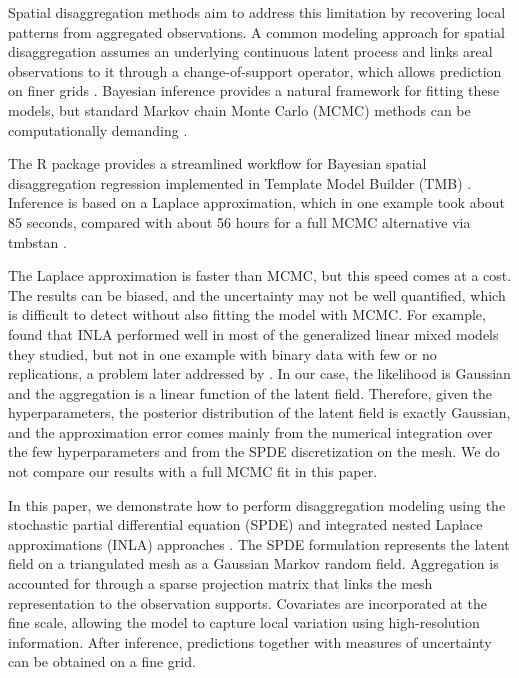 Spatial disaggregation methods aim to address this limitation by recovering local patterns from aggregated observations. A common modeling approach for spatial disaggregation assumes an underlying continuous latent process and links areal observations to it through a change-of-support operator, which allows prediction on finer grids \citep{fuentesandraftery05}. Bayesian inference provides a natural framework for fitting these models, but standard Markov chain Monte Carlo (MCMC) \citep{Metropolis1953, Hastings1970} methods can be computationally demanding \citep{tanaka2019spatiallya, yousefi2019multitaska}.

The R package  provides a streamlined workflow for Bayesian spatial disaggregation regression implemented in Template Model Builder (TMB) \citep{Kristensen2016TMB, Monnahan2018TMBstan}. Inference is based on a Laplace approximation, which in one example took about 85 seconds, compared with about 56 hours for a full MCMC alternative via tmbstan \citep{nandi2023disaggregation}.

The Laplace approximation is faster than MCMC, but this speed comes at a cost. The results can be biased, and the uncertainty may not be well quantified, which is difficult to detect without also fitting the model with MCMC. For example, \citet{fong2010bayesian} found that INLA performed well in most of the generalized linear mixed models they studied, but not in one example with binary data with few or no replications, a problem later addressed by \citet{ferkingstad2015improving}. In our case, the likelihood is Gaussian and the aggregation is a linear function of the latent field. Therefore, given the hyperparameters, the posterior distribution of the latent field is exactly Gaussian, and the approximation error comes mainly from the numerical integration over the few hyperparameters and from the SPDE discretization on the mesh. We do not compare our results with a full MCMC fit in this paper.

In this paper, we demonstrate how to perform disaggregation modeling using the stochastic partial differential equation (SPDE) and integrated nested Laplace approximations (INLA) approaches \citep{rue_et_al_r_inla_2009, Lindgren2011}. The SPDE formulation represents the latent field on a triangulated mesh as a Gaussian Markov random field. Aggregation is accounted for through a sparse projection matrix that links the mesh representation to the observation supports. Covariates are incorporated at the fine scale, allowing the model to capture local variation using high-resolution information. After inference, predictions together with measures of uncertainty can be obtained on a fine grid.

